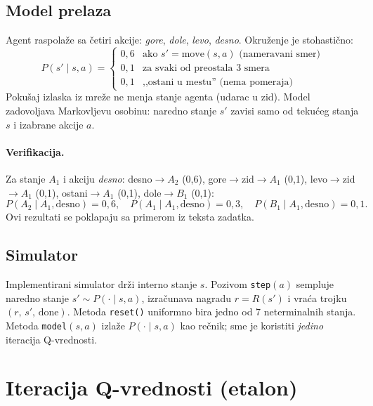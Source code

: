 \documentclass[12pt,a4paper]{article}
\begin{document}
\subsection{Model prelaza}

Agent raspolaže sa četiri akcije: \emph{gore}, \emph{dole}, \emph{levo},
\emph{desno}. Okruženje je stohastično:
\[
P(s' \mid s, a) =
\begin{cases}
  0{,}6 & \text{ako } s' = \mathrm{move}(s,a) \text{ (nameravani smer)}\\
  0{,}1 & \text{za svaki od preostala 3 smera}\\
  0{,}1 & \text{,,ostani u mestu'' (nema pomeraja)}
\end{cases}
\]
Pokušaj izlaska iz mreže ne menja stanje agenta (udarac u zid).
Model zadovoljava Markovljevu osobinu: naredno stanje $s'$ zavisi samo od tekućeg
stanja $s$ i izabrane akcije $a$.

\paragraph{Verifikacija.}
Za stanje $A_1$ i akciju \emph{desno}: desno$\to A_2$ (0{,}6),
gore$\to$zid$\to A_1$ (0{,}1), levo$\to$zid$\to A_1$ (0{,}1),
ostani$\to A_1$ (0{,}1), dole$\to B_1$ (0{,}1):
\[
P(A_2 \mid A_1, \text{desno}) = 0{,}6,\quad
P(A_1 \mid A_1, \text{desno}) = 0{,}3,\quad
P(B_1 \mid A_1, \text{desno}) = 0{,}1.
\]
Ovi rezultati se poklapaju sa primerom iz teksta zadatka.

\subsection{Simulator}

Implementirani simulator drži interno stanje $s$. Pozivom \texttt{step}$(a)$
sempluje naredno stanje $s' \sim P(\cdot \mid s, a)$, izračunava nagradu
$r = R(s')$ i vraća trojku $(r,\, s',\, \text{done})$.
Metoda \texttt{reset()} uniformno bira jedno od 7 neterminalnih stanja.
Metoda \texttt{model}$(s,a)$ izlaže $P(\cdot \mid s, a)$ kao rečnik;
sme je koristiti \emph{jedino} iteracija Q-vrednosti.


\section{Iteracija Q-vrednosti (etalon)}
\end{document}
